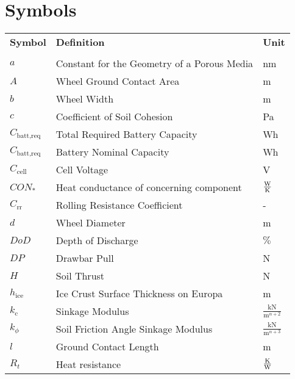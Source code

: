 \chapter*{Symbols}



\renewcommand{\arraystretch}{1.2}

\begin{longtable}[l]{lll}

	\textbf{Symbol}	&	\textbf{Definition}	\hspace{8cm}	&	\textbf{Unit}	\\ \\
	

\(a\)					&	Constant for the Geometry of a Porous Media	& nm							\\
\(A\)					&	Wheel Ground Contact Area					& m								\\
\(b\)					&	Wheel Width 								& m								\\
\(c\)					&	Coefficient of Soil Cohesion				& Pa							\\
$C_\text{batt,req}$		&	Total Required Battery Capacity				& Wh							\\
$C_\text{batt,req}$		&	Battery Nominal Capacity					& Wh							\\
$C_\text{cell}$			&	Cell Voltage								& V								\\
$CON_*$					&	Heat conductance of concerning component	& $\frac{{\rm W}}{{\rm K}}$				\\
\(C_\text{rr}\)		&	Rolling Resistance Coefficient					& -								\\	
\(d\)					&	Wheel Diameter								& m								\\
$DoD$					&	Depth of Discharge							& $\%$							\\
\(DP\)					&	Drawbar Pull								& N								\\
\(H\)					&	Soil Thrust									& N								\\
\(h_\text{ice}\)		&	Ice Crust Surface Thickness on Europa		&	m							\\
\(k_\text{c}\)			&	Sinkage Modulus								& \(\frac{\text{kN}}{\text{m}^{n+2}}\) \\
\(k_\phi\)				&	Soil Friction Angle Sinkage Modulus			& \(\frac{\text{kN}}{\text{m}^{n+3}}\) \\
\(l\)					&	Ground Contact Length						& m								\\
$R_t$					&	Heat resistance								& $\frac{{\rm K}}{{\rm W}}$				\\

\end{longtable}
